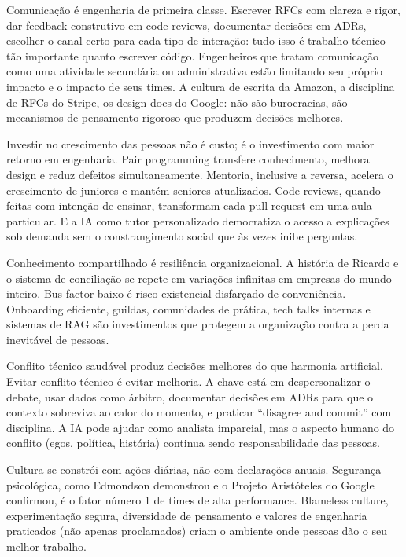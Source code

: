 Comunicação é engenharia de primeira classe. Escrever RFCs com clareza e
rigor, dar feedback construtivo em code reviews, documentar decisões em
ADRs, escolher o canal certo para cada tipo de interação: tudo isso é
trabalho técnico tão importante quanto escrever código. Engenheiros que
tratam comunicação como uma atividade secundária ou administrativa estão
limitando seu próprio impacto e o impacto de seus times. A cultura de
escrita da Amazon, a disciplina de RFCs do Stripe, os design docs do
Google: não são burocracias, são mecanismos de pensamento rigoroso que
produzem decisões melhores.

Investir no crescimento das pessoas não é custo; é o investimento com maior
retorno em engenharia. Pair programming transfere conhecimento, melhora
design e reduz defeitos simultaneamente. Mentoria, inclusive a reversa,
acelera o crescimento de juniores e mantém seniores atualizados. Code
reviews, quando feitas com intenção de ensinar, transformam cada pull
request em uma aula particular. E a IA como tutor personalizado democratiza
o acesso a explicações sob demanda sem o constrangimento social que às
vezes inibe perguntas.

Conhecimento compartilhado é resiliência organizacional. A história de
Ricardo e o sistema de conciliação se repete em variações infinitas em
empresas do mundo inteiro. Bus factor baixo é risco existencial disfarçado
de conveniência. Onboarding eficiente, guildas, comunidades de prática,
tech talks internas e sistemas de RAG são investimentos que protegem a
organização contra a perda inevitável de pessoas.

Conflito técnico saudável produz decisões melhores do que harmonia
artificial. Evitar conflito técnico é evitar melhoria. A chave está em
despersonalizar o debate, usar dados como árbitro, documentar decisões em
ADRs para que o contexto sobreviva ao calor do momento, e praticar
``disagree and commit'' com disciplina. A IA pode ajudar como analista
imparcial, mas o aspecto humano do conflito (egos, política, história)
continua sendo responsabilidade das pessoas.

Cultura se constrói com ações diárias, não com declarações anuais. Segurança
psicológica, como Edmondson demonstrou e o Projeto Aristóteles do Google
confirmou, é o fator número 1 de times de alta performance. Blameless
culture, experimentação segura, diversidade de pensamento e valores de
engenharia praticados (não apenas proclamados) criam o ambiente onde
pessoas dão o seu melhor trabalho.

